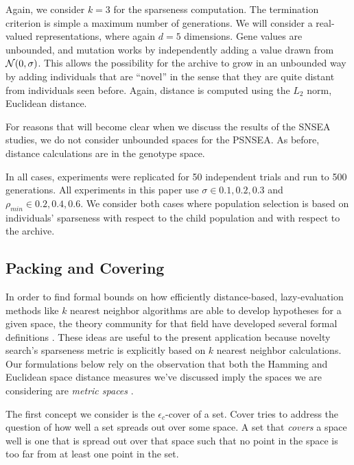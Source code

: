 \documentclass[twoside]{article}
\begin{document}
Again, we consider $k=3$ for the sparseness computation.  The termination criterion is simple a maximum number of generations.  We will consider a real-valued representations, where again $d=5$ dimensions.  Gene values are unbounded, and mutation works by independently adding a value drawn from ${\cal N}(0,\sigma)$.  This allows the possibility for the archive to grow in an unbounded way by adding individuals that are ``novel'' in the sense that they are quite distant from individuals seen before.  Again, distance is computed using the $L_2$ norm, Euclidean distance.

For reasons that will become clear when we discuss the results of the SNSEA studies, we do not consider unbounded spaces for the PSNSEA.  As before, distance calculations are in the genotype space.

In all cases, experiments were replicated for 50 independent trials and run to 500 generations. All experiments in this paper use $\sigma\in{0.1,0.2,0.3}$ and $\rho_{min} \in {0.2,0.4,0.6}$.  We consider both cases where population selection is based on individuals' sparseness with respect to the child population and with respect to the archive.


\subsection{Packing and Covering}
\label{subsec:knn}

In order to find formal bounds on how efficiently distance-based, lazy-evaluation methods like $k$ nearest neighbor algorithms are able to develop hypotheses for a given space, the theory community for that field have developed several formal definitions \citep{Clarkson1999dcg}.  These ideas are useful to the present application because novelty search's sparseness metric is explicitly based on $k$ nearest neighbor calculations.  Our formulations below rely on the observation that both the Hamming and Euclidean space distance measures we've discussed imply the spaces we are considering are \emph{metric spaces} \citep{Bryant1985}.

The first concept we consider is the $\epsilon_c$-cover of a set.  Cover tries to address the question of how well a set spreads out over some space.  A set that \emph{covers} a space well is one that is spread out over that space such that no point in the space is too far from at least one point in the set.
\end{document}
